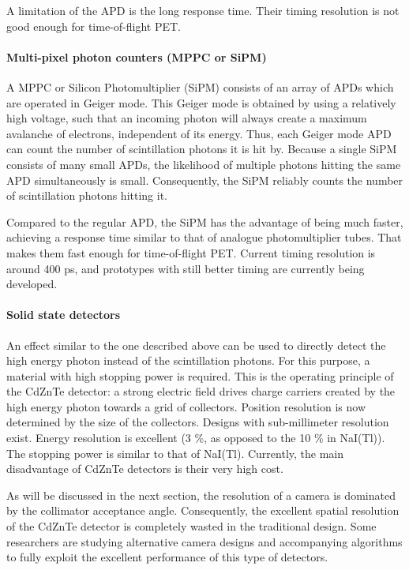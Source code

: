 \documentclass[11pt,oneside]{article}
\begin{document}
A limitation of the APD is the long response time. Their timing
resolution is not good enough for time-of-flight PET.

\paragraph{Multi-pixel photon counters (MPPC or SiPM)}
A MPPC or Silicon Photomultiplier (SiPM) consists of an array of APDs
which are operated in Geiger mode. This Geiger mode is obtained by
using a relatively high voltage, such that an incoming photon will
always create a maximum avalanche of electrons, independent of its
energy. Thus, each Geiger mode APD can count the number of
scintillation photons it is hit by. Because a single SiPM consists of
many small APDs, the likelihood of multiple photons hitting the same
APD simultaneously is small. Consequently, the SiPM reliably counts
the number of scintillation photons hitting it.

Compared to the regular APD, the SiPM has the advantage of being much
faster, achieving a response time similar to that of analogue
photomultiplier tubes. That makes them fast enough for time-of-flight
PET. Current timing resolution is around 400 ps, and prototypes with
still better timing are currently being developed.

\paragraph{Solid state detectors}
An effect similar to the one described above can be used to directly
detect the high energy photon instead of the scintillation
photons. For this purpose, a material with high stopping power is
required. This is the operating principle of the CdZnTe detector: a
strong electric field drives charge carriers created by the high
energy photon towards a grid of collectors.  Position resolution is
now determined by the size of the collectors. Designs with
sub-millimeter resolution exist. Energy resolution is excellent (3 \%,
as opposed to the 10 \% in NaI(Tl)). The stopping power is similar to
that of NaI(Tl). Currently, the main disadvantage of CdZnTe detectors
is their very high cost.

As will be discussed in the next section, the resolution of a camera is
dominated by the collimator acceptance angle. Consequently, the excellent
spatial resolution of the CdZnTe detector is completely wasted in the
traditional design. Some researchers are studying alternative camera
designs and accompanying algorithms to fully exploit the excellent
performance of this type of detectors.
\end{document}
